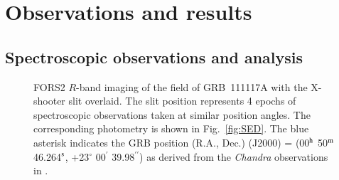 \documentclass[referee]{aa}
\newcommand{\lya}{Ly$\alpha$}
\newcommand{\hb}{H$\beta$}
\newcommand{\ha}{H$\alpha$}
\newcommand{\oii}{[\ion{O}{ii}]}
\newcommand{\oiii}{[\ion{O}{iii}]}
\begin{document}

\section{Observations and results}

\subsection{Spectroscopic observations and analysis}

\begin{figure}
	\centering
	\caption{
	FORS2 $R$-band imaging of the field of GRB~111117A with the X-shooter slit
overlaid. The slit position represents 4 epochs of spectroscopic observations
taken at similar position angles. The corresponding photometry is shown in
Fig.~\ref{fig:SED}. The blue asterisk indicates the GRB position (R.A., Dec.) (J2000) = (00$^{\rm h}$ 50$^{\rm m}$ 46.264$^{\rm s}$, +23$^{\circ}$ 00$^{\prime}$ 39.98$^{\prime\prime}$) as derived
from the \emph{Chandra} observations in \citet{Sakamoto2013}.
	}
	\label{fig:spec_setup}
\end{figure}



\begin{figure*}
	\centering
	\caption{2D-images of the emission lines corresponding to \lya, \oii$\lambda$3727, \hb, \oiii$\lambda$4959, \oiii$\lambda$5007, and \ha. The location of bright skylines are marked by blue boxes. The locations of the emission lines are indicated with red ellipses. Because the host is observed in nodding-mode, negative images of the emission lines appear on both sides in the spatial direction. For the upper, left panel containing \lya, the systemic redshift position of \lya{} is marked by a yellow, vertical, dashed line. The red part of the \oii$\lambda$3727-doublet is affected by atmospheric absorption.}
	\label{fig:line}
\end{figure*}
\end{document}
